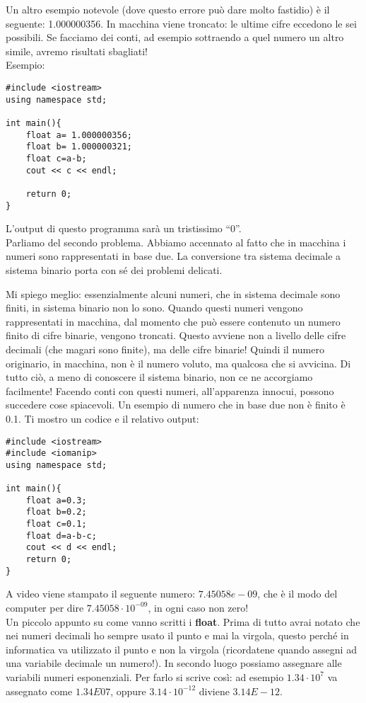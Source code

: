 	Un altro esempio notevole (dove questo errore può dare molto fastidio) è il seguente: 1.000000356. In macchina viene troncato: le ultime cifre eccedono le sei possibili. Se facciamo dei conti, ad esempio sottraendo a quel numero un altro simile, avremo risultati sbagliati! 
	\\Esempio:
	\begin{lstlisting}
#include <iostream>
using namespace std;

int main(){
	float a= 1.000000356;
	float b= 1.000000321;
	float c=a-b;
	cout << c << endl;

	return 0;
}
	\end{lstlisting}
	L'output di questo programma sarà un tristissimo ``0''.
	\\
	
	Parliamo del secondo problema. Abbiamo accennato al fatto che in macchina i numeri sono rappresentati in base due. La conversione tra sistema decimale a sistema binario porta con sé dei problemi delicati. 
	
	Mi spiego meglio: essenzialmente alcuni numeri, che in sistema decimale sono finiti, in sistema binario non lo sono. Quando questi numeri vengono rappresentati in macchina, dal momento che può essere contenuto un numero finito di cifre binarie, vengono troncati. Questo avviene non a livello delle cifre decimali (che magari sono finite), ma delle cifre binarie! Quindi il numero originario, in macchina, non è il numero voluto, ma qualcosa che si avvicina. Di tutto ciò, a meno di conoscere il sistema binario, non ce ne accorgiamo facilmente! Facendo conti con questi numeri, all'apparenza innocui, possono succedere cose spiacevoli. Un esempio di numero che in base due non è finito è 0.1. Ti mostro un codice e il relativo output:
	\begin{lstlisting}
#include <iostream>
#include <iomanip>
using namespace std;

int main(){
	float a=0.3;
	float b=0.2;
	float c=0.1;
	float d=a-b-c;
	cout << d << endl;
	return 0;
}
	\end{lstlisting}
	A video viene stampato il seguente numero: $7.45058e-09$, che è il modo del computer per dire $7.45058\cdot10^{-09}$, in ogni caso non zero!
	\\
	
	Un piccolo appunto su come vanno scritti i \textbf{float}. Prima di tutto avrai notato che nei numeri decimali ho sempre usato il punto e mai la virgola, questo perché in informatica va utilizzato il punto e non la virgola (ricordatene quando assegni ad una variabile decimale un numero!). In secondo luogo possiamo assegnare alle variabili numeri esponenziali. Per farlo si scrive così: ad esempio $1.34\cdot10^{7}$ va assegnato come $1.34E07$, oppure $3.14\cdot10^{-12}$ diviene $3.14E-12$. 
	
